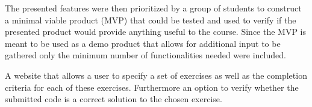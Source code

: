 The presented features were then prioritized by a group of students to construct a minimal viable product (MVP) that could be tested and used to verify if the presented product would provide anything useful to the course. Since the MVP is meant to be used as a demo product that allows for additional input to be gathered only the minimum number of functionalities needed were included.

\begin{displayquote}
A website that allows a user to specify a set of exercises as well as the completion criteria for each of these exercises. Furthermore an option to verify whether the submitted code is a correct solution to the chosen exercise.
\end{displayquote}





